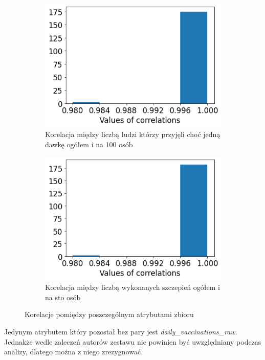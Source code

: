 \documentclass[12pt, oneside]{article}
\begin{document}
\begin{figure}
  \begin{subfigure}[t]{.45\textwidth}
    \centering
    \includegraphics[width=\linewidth]{../img/null_column_diff3.png}
    \caption{Korelacja między liczbą ludzi którzy przyjęli choć jedną dawkę ogółem i na 100 osób}
  \end{subfigure}
  \hfill
  \begin{subfigure}[t]{.45\textwidth}
    \centering
    \includegraphics[width=\linewidth]{../img/null_column_diff4.png}
    \caption{Korelacja między liczbą wykonanych szczepień ogółem i na sto osób}
  \end{subfigure}
  \caption{Korelacje pomiędzy poszczególnym atrybutami zbioru}
\label{Rys:hist}
\end{figure}

Jedynym atrybutem który pozostał bez pary jest \textit{daily\_vaccinations\_raw}. Jednakże wedle zaleczeń autorów zestawu nie powinien być uwzględniany podczas analizy, dlatego można z niego zrezygnować. 
\end{document}

